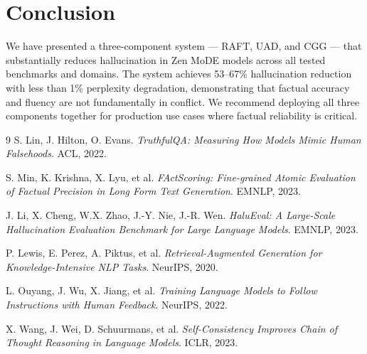 \documentclass[11pt,a4paper]{article}
\begin{document}
\section{Conclusion}
\label{sec:conclusion}

We have presented a three-component system — RAFT, UAD, and CGG — that substantially
reduces hallucination in Zen MoDE models across all tested benchmarks and domains.
The system achieves 53--67\% hallucination reduction with less than 1\% perplexity
degradation, demonstrating that factual accuracy and fluency are not fundamentally
in conflict. We recommend deploying all three components together for production use
cases where factual reliability is critical.

\begin{thebibliography}{9}
S. Lin, J. Hilton, O. Evans.
\textit{TruthfulQA: Measuring How Models Mimic Human Falsehoods}.
ACL, 2022.

S. Min, K. Krishna, X. Lyu, et al.
\textit{FActScoring: Fine-grained Atomic Evaluation of Factual Precision in Long Form
Text Generation}. EMNLP, 2023.

J. Li, X. Cheng, W.X. Zhao, J.-Y. Nie, J.-R. Wen.
\textit{HaluEval: A Large-Scale Hallucination Evaluation Benchmark for Large Language
Models}. EMNLP, 2023.

P. Lewis, E. Perez, A. Piktus, et al.
\textit{Retrieval-Augmented Generation for Knowledge-Intensive NLP Tasks}.
NeurIPS, 2020.

L. Ouyang, J. Wu, X. Jiang, et al.
\textit{Training Language Models to Follow Instructions with Human Feedback}.
NeurIPS, 2022.

X. Wang, J. Wei, D. Schuurmans, et al.
\textit{Self-Consistency Improves Chain of Thought Reasoning in Language Models}.
ICLR, 2023.
\end{thebibliography}
\end{document}
